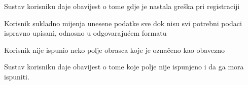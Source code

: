 \begin{packed_item}
\begin{packed_item}
\begin{packed_enum}
								\item Sustav korisniku daje obavijest o tome gdje je nastala greška pri registraciji
								\item Korisnik sukladno mijenja unesene podatke sve dok nisu svi potrebni podaci ispravno upisani, odnosno u odgovarajućem formatu
								
							\end{packed_enum}
							\item[2.b]  Korisnik nije ispunio neko polje obrasca koje je označeno kao obavezno
							\item[] \begin{packed_enum}
								
								\item Sustav korisniku daje obavijest o tome koje polje nije ispunjeno i da ga mora ispuniti.
								
							\end{packed_enum}
							
						\end{packed_item}
			
					\end{packed_item}

					

